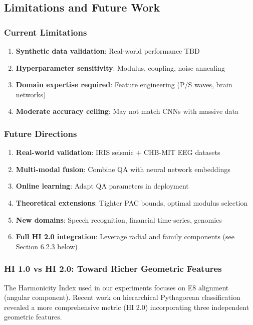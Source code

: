 \documentclass[11pt]{article}
\theoremstyle{remark}
\begin{document}
\subsection{Limitations and Future Work}

\subsubsection{Current Limitations}
\begin{enumerate}
\item \textbf{Synthetic data validation}: Real-world performance TBD
\item \textbf{Hyperparameter sensitivity}: Modulus, coupling, noise annealing
\item \textbf{Domain expertise required}: Feature engineering (P/S waves, brain networks)
\item \textbf{Moderate accuracy ceiling}: May not match CNNs with massive data
\end{enumerate}

\subsubsection{Future Directions}
\begin{enumerate}
\item \textbf{Real-world validation}: IRIS seismic + CHB-MIT EEG datasets
\item \textbf{Multi-modal fusion}: Combine QA with neural network embeddings
\item \textbf{Online learning}: Adapt QA parameters in deployment
\item \textbf{Theoretical extensions}: Tighter PAC bounds, optimal modulus selection
\item \textbf{New domains}: Speech recognition, financial time-series, genomics
\item \textbf{Full HI 2.0 integration}: Leverage radial and family components (see Section 6.2.3 below)
\end{enumerate}

\subsubsection{HI 1.0 vs HI 2.0: Toward Richer Geometric Features}

The Harmonicity Index used in our experiments focuses on E8 alignment (angular component). Recent work on hierarchical Pythagorean classification \cite{pythagorean_families_2025} revealed a more comprehensive metric (HI 2.0) incorporating three independent geometric features.
\end{document}
